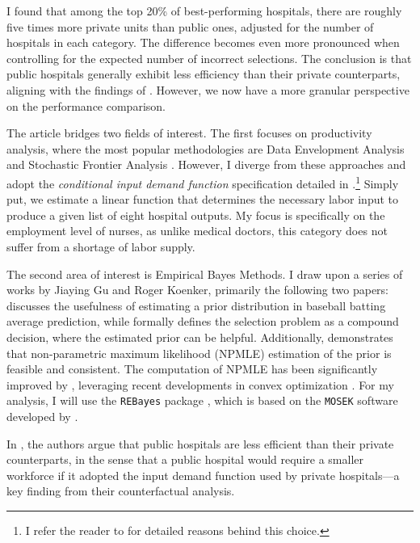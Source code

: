 \documentclass[12pt]{article}
\begin{document}
I found that among the top 20\% of best-performing hospitals, there are roughly
five times more private units than public ones, adjusted for the number of
hospitals in each category. The difference becomes even more pronounced when
controlling for the expected number of incorrect selections. The conclusion is
that public hospitals generally exhibit less efficiency than their private
counterparts, aligning with the findings of \cite{croiset2024hospitals}.
However, we now have a more granular perspective on the performance comparison.

The article bridges two fields of interest. The first focuses on productivity
analysis, where the most popular methodologies are Data Envelopment Analysis
\citep{charnes1978measuring} and Stochastic Frontier Analysis
\citep{aigner1977formulation,meeusen1977efficiency}. However, I diverge from
these approaches and adopt the \textit{conditional input demand function}
specification detailed in \cite{croiset2024hospitals}.\footnote{I refer the
    reader to \citet{croiset2024hospitals} for detailed reasons behind this
    choice.} Simply put, we estimate a linear function that determines the
necessary labor input to produce a given list of eight hospital outputs. My
focus is specifically on the employment level of nurses, as unlike medical
doctors, this category does not suffer from a shortage of labor supply.

The second area of interest is Empirical Bayes Methods. I draw upon a series of
works by Jiaying Gu and Roger Koenker, primarily the following two papers:
\citet{gu2017empirical} discusses the usefulness of estimating a prior
distribution in baseball batting average prediction, while
\citet{gu2023invidious} formally defines the selection problem as a compound
decision, where the estimated prior can be helpful. Additionally,
\citet{kiefer1956consistency} demonstrates that non-parametric maximum
likelihood (NPMLE) estimation of the prior is feasible and consistent. The
computation of NPMLE has been significantly improved by
\citet{koenker2014convex}, leveraging recent developments in convex
optimization \citep{andersen2010mosek}. For my analysis, I will use the
\verb+REBayes+ package \citep{koenker2017rebayes}, which is based on the
\verb+MOSEK+ software developed by \citet{andersen2010mosek}.

In \cite{croiset2024hospitals}, the authors argue that public hospitals are
less efficient than their private counterparts, in the sense that a public
hospital would require a smaller workforce if it adopted the input demand
function used by private hospitals—a key finding from their counterfactual
analysis.
\end{document}
